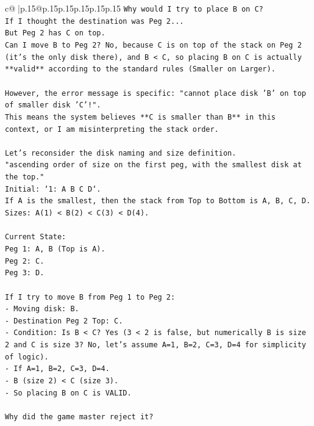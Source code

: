 \documentclass{article}
\begin{document}
{\begin{supertabular}{c@{$\;$}|p{.15\linewidth}@{}p{.15\linewidth}p{.15\linewidth}p{.15\linewidth}p{.15\linewidth}p{.15\linewidth}}
{{{\texttt{Why would I try to place B on C?} \\
\texttt{If I thought the destination was Peg 2...} \\
\texttt{But Peg 2 has C on top.} \\
\texttt{Can I move B to Peg 2? No, because C is on top of the stack on Peg 2 (it's the only disk there), and B < C, so placing B on C is actually **valid** according to the standard rules (Smaller on Larger).} \\
\\ 
\texttt{However, the error message is specific: "cannot place disk 'B' on top of smaller disk 'C'!".} \\
\texttt{This means the system believes **C is smaller than B** in this context, or I am misinterpreting the stack order.} \\
\\ 
\texttt{Let's reconsider the disk naming and size definition.} \\
\texttt{"ascending order of size on the first peg, with the smallest disk at the top."} \\
\texttt{Initial: `1: A B C D`.} \\
\texttt{If A is the smallest, then the stack from Top to Bottom is A, B, C, D.} \\
\texttt{Sizes: A(1) < B(2) < C(3) < D(4).} \\
\\ 
\texttt{Current State:} \\
\texttt{Peg 1: A, B (Top is A).} \\
\texttt{Peg 2: C.} \\
\texttt{Peg 3: D.} \\
\\ 
\texttt{If I try to move B from Peg 1 to Peg 2:} \\
\texttt{{-} Moving disk: B.} \\
\texttt{{-} Destination Peg 2 Top: C.} \\
\texttt{{-} Condition: Is B < C? Yes (3 < 2 is false, but numerically B is size 2 and C is size 3? No, let's assume A=1, B=2, C=3, D=4 for simplicity of logic).} \\
\texttt{{-} If A=1, B=2, C=3, D=4.} \\
\texttt{{-} B (size 2) < C (size 3).} \\
\texttt{{-} So placing B on C is VALID.} \\
\\ 
\texttt{Why did the game master reject it?} \\
}}}
\end{supertabular}}
\end{document}
